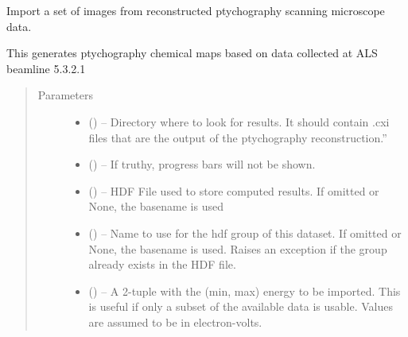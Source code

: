 \documentclass[letterpaper,10pt,english]{sphinxmanual}
\begin{document}
\begin{fulllineitems}
\label{\detokenize{xanespy:xanespy.importers.import_nanosurveyor_frameset}}
Import a set of images from reconstructed ptychography scanning microscope data.

This generates ptychography chemical maps based on data collected at ALS beamline
5.3.2.1
\begin{quote}\begin{description}
\item[{Parameters}] \leavevmode\begin{itemize}
\item {} 
 () -- Directory where to look for results. It should contain .cxi
files that are the output of the ptychography reconstruction.''

\item {} 
 (\sphinxstyleliteralemphasis{, }) -- If truthy, progress bars will not be shown.

\item {} 
 (\sphinxstyleliteralemphasis{, }) -- HDF File used to store computed results. If omitted or None, the
 basename is used

\item {} 
 (\sphinxstyleliteralemphasis{, }) -- Name to use for the hdf group of this dataset. If omitted or
None, the  basename is used. Raises an exception if
the group already exists in the HDF file.

\item {} 
 (\sphinxstyleliteralemphasis{, }) -- A 2-tuple with the (min, max) energy to be imported. This is
useful if only a subset of the available data is usable. Values
are assumed to be in electron-volts.


\end{itemize}
\end{description}
\end{quote}
\end{fulllineitems}
\end{document}
